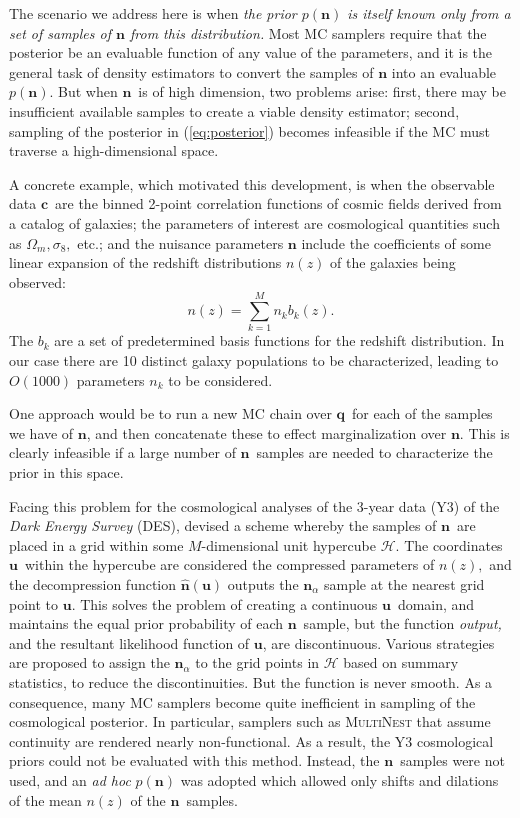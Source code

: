 \documentclass[linenumbers, onecolumn]{aastex63}
\newcommand{\vecc}{\ensuremath{\mathbf{c}}}
\newcommand{\vecq}{\ensuremath{\mathbf{q}}}
\newcommand{\vecn}{\ensuremath{\mathbf{n}}}
\newcommand{\vecu}{\ensuremath{\mathbf{u}}}
\begin{document}
The scenario we address here is when \emph{the prior $p(\vecn)$ is itself known only from a set of samples of $\vecn$ from this distribution.} Most MC samplers require that the posterior be an evaluable function of any value of the parameters, and it is the general task of density estimators to convert the samples of $\vecn$ into an evaluable $p(\vecn).$  But when \vecn\ is of high dimension, two problems arise: first, there may be insufficient available samples to create a viable density estimator; second, sampling of the posterior in (\ref{eq:posterior}) becomes infeasible if the MC must traverse a high-dimensional space.

A concrete example, which motivated this development,
is when the observable data \vecc\ are the binned 2-point correlation functions of
cosmic fields derived from a catalog of galaxies; the parameters of
interest are cosmological quantities such as $\Omega_m, \sigma_8,$
etc.; and the nuisance parameters $\vecn$
include the coefficients of some linear expansion of the redshift distributions $n(z)$ of the galaxies being observed:
\begin{equation}
  n(z) = \sum_{k=1}^{M} n_k b_k(z).
  \label{eq:nzbasis}
\end{equation}
The $b_k$ are a set of predetermined basis functions for the redshift
distribution.  In our case there are 10 distinct galaxy populations to be characterized, leading to $O(1000)$ parameters $n_k$ to be considered.

One approach would be to run a new MC chain over \vecq\ for each of the samples we have of \vecn, and then concatenate these to effect marginalization over \vecn.  This is clearly infeasible if a large number of \vecn\ samples are needed to characterize the prior in this space.

Facing this problem for the cosmological analyses of the 3-year data (Y3)
of the \textit{Dark Energy Survey} (DES),
\citet{hyperrank} devised a scheme whereby
the samples of \vecn\ are placed in a grid within some $M$-dimensional
unit hypercube $\mathcal{H}$.  The coordinates \vecu\ within the hypercube
are considered the compressed parameters of $n(z),$ and the
decompression function
$\hat{\vecn}(\vecu)$ outputs the $\vecn_\alpha$ sample at the nearest grid point to
  \vecu.  This solves the problem of creating a continuous \vecu\
  domain, and maintains the equal prior probability of each \vecn\
  sample, but the function \emph{output,} and the resultant likelihood
  function of \vecu, are discontinuous.
Various strategies are proposed to assign the $\vecn_\alpha$ to the grid points in
$\mathcal{H}$ based on summary statistics, to reduce the
discontinuities.  But the function is never smooth.
As a consequence, many MC samplers become quite inefficient in
sampling of the cosmological posterior.  In particular, samplers such as \textsc{MultiNest} that assume continuity are rendered nearly non-functional.  As a result, the Y3 cosmological priors could not be evaluated with this method.  Instead, the \vecn\ samples were not used, and an \textit{ad hoc} $p(\vecn)$ was adopted which allowed only shifts and dilations of the mean $n(z)$ of the \vecn\ samples.
\end{document}
